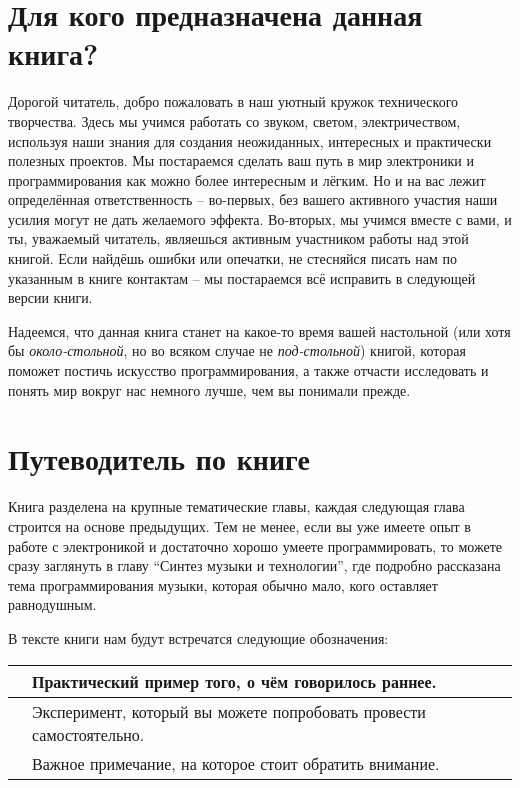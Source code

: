 \documentclass[../sparc.tex]{subfiles}
\begin{document}
\section*{Для кого предназначена данная книга?}

Дорогой читатель, добро пожаловать в наш уютный кружок технического творчества.
Здесь мы учимся работать со звуком, светом, электричеством, используя наши
знания для создания неожиданных, интересных и практически полезных проектов. Мы
постараемся сделать ваш путь в мир электроники и программирования как можно
более интересным и лёгким. Но и на вас лежит определённая ответственность --
во-первых, без вашего активного участия наши усилия могут не дать желаемого
эффекта. Во-вторых, мы учимся вместе с вами, и ты, уважаемый читатель, являешься
активным участником работы над этой книгой. Если найдёшь ошибки или опечатки, не
стесняйся писать нам по указанным в книге контактам -- мы постараемся всё
исправить в следующей версии книги.

Надеемся, что данная книга станет на какое-то время вашей настольной (или хотя
бы \emph{около-стольной}, но во всяком случае не \emph{под-стольной}) книгой,
которая поможет постичь искусство программирования, а также отчасти исследовать
и понять мир вокруг нас немного лучше, чем вы понимали прежде.

\section*{Путеводитель по книге}

Книга разделена на крупные тематические главы, каждая следующая глава строится
на основе предыдущих.  Тем не менее, если вы уже имеете опыт в работе с
электроникой и достаточно хорошо умеете программировать, то можете сразу
заглянуть в главу ``Синтез музыки и технологии'', где подробно рассказана тема
программирования музыки, которая обычно мало,  кого оставляет равнодушным.

В тексте книги нам будут встречатся следующие обозначения:

\begin{table}[H]
  \centering
  \def\arraystretch{3.0}%
  \begin{tabular}{|m{4em}|m{15em}|}
    \hline
    
    & Практический пример того, о чём говорилось раннее. \\
    \hline
    
    & Эксперимент, который вы можете попробовать провести самостоятельно. \\
    \hline
    
    & Важное примечание, на которое стоит обратить внимание. \\
    \hline
  \end{tabular}
\end{table}
\end{document}
